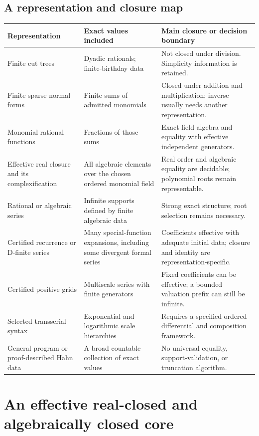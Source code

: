 \documentclass[11pt,letterpaper]{article}
\numberwithin{equation}{section}
\theoremstyle{definition}
\theoremstyle{remark}\newtheorem{remark}[theorem]{Remark}
\begin{document}
\subsection{A representation and closure map}
\begin{longtable}{@{}P{0.24\textwidth}P{0.31\textwidth}P{0.37\textwidth}@{}}
\toprule
Representation & Exact values included & Main closure or decision boundary\\
\midrule\endhead
Finite cut trees & Dyadic rationals; finite-birthday data & Not closed under
division. Simplicity information is retained.\\[0.45em]
Finite sparse normal forms & Finite sums of admitted monomials & Closed under
addition and multiplication; inverse usually needs another representation.\\[0.45em]
Monomial rational functions & Fractions of those sums & Exact field algebra
and equality with effective independent generators.\\[0.45em]
Effective real closure and its complexification & All algebraic elements over
the chosen ordered monomial field & Real order and algebraic equality are
decidable; polynomial roots remain representable.\\[0.45em]
Rational or algebraic series & Infinite supports defined by finite algebraic
data & Strong exact structure; root selection remains necessary.\\[0.45em]
Certified recurrence or D-finite series & Many special-function expansions,
including some divergent formal series & Coefficients effective with adequate
initial data; closure and identity are representation-specific.\\[0.45em]
Certified positive grids & Multiscale series with finite generators & Fixed
coefficients can be effective; a bounded valuation prefix can still be infinite.\\[0.45em]
Selected transserial syntax & Exponential and logarithmic scale hierarchies &
Requires a specified ordered differential and composition framework.\\[0.45em]
General program or proof-described Hahn data & A broad countable collection
of exact values & No universal equality, support-validation, or truncation
algorithm.\\
\bottomrule
\end{longtable}

\section{An effective real-closed and algebraically closed core}
\label{sec:core}
\end{document}
